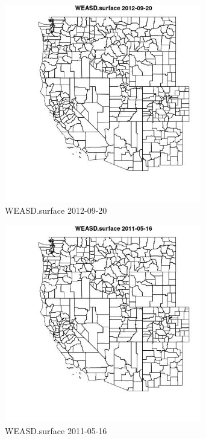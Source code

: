 \begin{figure} 
\centering  
\includegraphics[width=0.77\textwidth]{Code_Outputs/ML_input_report_ML_input_PM25_Step5_part_d_de_duplicated_aves_ML_input_MapObsWEASDsurface2012-09-20.jpg} 
\caption{\label{fig:ML_input_report_ML_input_PM25_Step5_part_d_de_duplicated_aves_ML_inputMapObsWEASDsurface2012-09-20}WEASD.surface 2012-09-20} 
\end{figure} 
 

\begin{figure} 
\centering  
\includegraphics[width=0.77\textwidth]{Code_Outputs/ML_input_report_ML_input_PM25_Step5_part_d_de_duplicated_aves_ML_input_MapObsWEASDsurface2011-05-16.jpg} 
\caption{\label{fig:ML_input_report_ML_input_PM25_Step5_part_d_de_duplicated_aves_ML_inputMapObsWEASDsurface2011-05-16}WEASD.surface 2011-05-16} 
\end{figure} 
 

